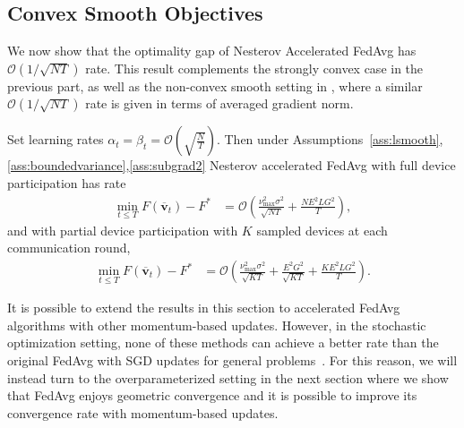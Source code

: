 \subsection{Convex Smooth Objectives}

We now show that the optimality gap of Nesterov Accelerated FedAvg has $\mathcal{O}(1/\sqrt{NT})$ rate. This result complements the strongly convex case in the previous
part, as well as the non-convex smooth setting in \cite{huo2020faster,yu2019linear,li2018federated},
where a similar $\mathcal{O}(1/\sqrt{NT})$ rate is given in terms
of averaged gradient norm. 
\begin{theorem}
	\label{thm:Nesterov_cvx}Set learning rates $\alpha_{t}=\beta_{t}=\mathcal{O}(\sqrt{\frac{N}{T}})$. Then under Assumptions~\ref{ass:lsmooth},\ref{ass:boundedvariance},\ref{ass:subgrad2} Nesterov accelerated FedAvg with
	full device participation has rate
	\begin{align*}
	\min_{t\leq T}F(\overline{\mathbf{v}}_{t})-F^{\ast} & =\mathcal{O}\left(\frac{\nu_{\max}^{2}\sigma^{2}}{\sqrt{NT}}+\frac{NE^{2}LG^{2}}{T}\right),
	\end{align*}
	and with partial device participation with $K$ sampled devices at
	each communication round, 
	\begin{align*}
	\min_{t\leq T}F(\overline{\mathbf{v}}_{t})-F^{\ast} & =\mathcal{O}\left(\frac{\nu_{\max}^{2}\sigma^{2}}{\sqrt{KT}}+\frac{E^{2}G^{2}}{\sqrt{KT}}+\frac{KE^{2}LG^{2}}{T}\right).
	\end{align*}
\end{theorem}
%
	It is possible to extend the results in this section to accelerated
    FedAvg algorithms with other momentum-based updates. However, in the
    stochastic optimization setting, none of these methods can achieve a better rate than the original FedAvg with SGD updates for general problems~\cite{kidambi2018insufficiency}.
    For this reason, we will instead turn to the overparameterized setting
    \cite{ma2017power,liu2018accelerating,canziani2016analysis} in the
    next section where we show that FedAvg enjoys geometric convergence
    and it is possible to improve its convergence rate with momentum-based updates.
